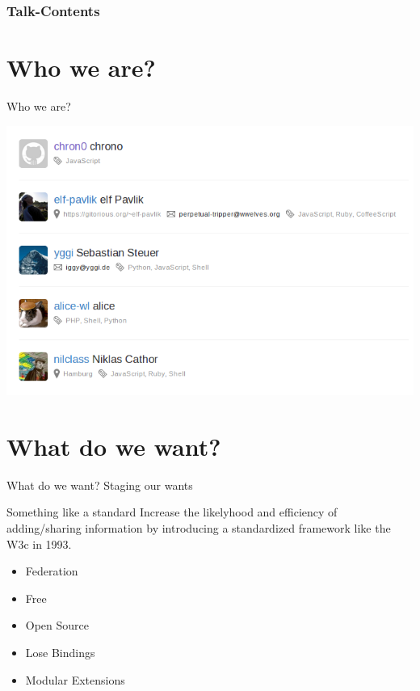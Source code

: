 \documentclass{beamer}
\begin{document}
\addtocounter{framenumber}{-1}


{
\begin{frame}[plain]
\frametitle{\vspace{-2.12ex}Talk-Contents}
 \tableofcontents
\end{frame}
}

\addtocounter{framenumber}{-1}
\setcounter{page}{1}

%
%

\section{Who we are?}

\begin{frame}{Who we are?}
 \vspace{0.8em}
 \begin{center}
  \includegraphics[scale=0.4]{images/dspace-hackers}
 \end{center}
\end{frame}

\section{What do we want?}

\begin{frame}{What do we want?}
 Staging our wants
\end{frame}

\begin{frame}{Something like a standard}
 Increase the likelyhood and efficiency of adding/sharing information by introducing
 a standardized framework like the W3c in 1993.
 \linebreak
 \begin{itemize}
  \item Federation
  \item Free
  \item Open Source
  \item Lose Bindings
  \item Modular Extensions
 \end{itemize}
\end{frame}
\end{document}
